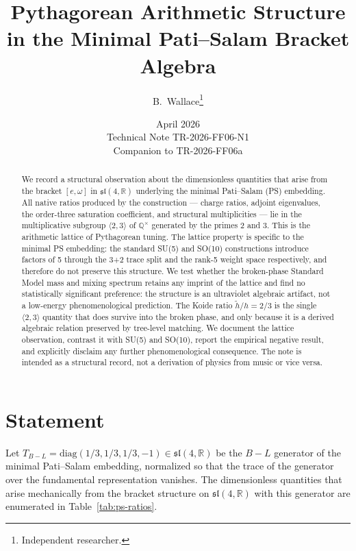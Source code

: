 \documentclass[11pt]{article}
\title{Pythagorean Arithmetic Structure in the Minimal Pati--Salam
Bracket Algebra}
\author{B.~Wallace\thanks{Independent researcher.}}
\date{April 2026 \\ Technical Note TR-2026-FF06-N1 \\
Companion to TR-2026-FF06a}
\theoremstyle{plain}
\theoremstyle{remark}
\newcommand{\sln}[1]{\mathfrak{sl}(#1,\mathbb{R})}
\newcommand{\TBL}{T_{B\!-\!L}}
\begin{document}
\maketitle

\begin{abstract}
We record a structural observation about the dimensionless quantities
that arise from the bracket $[e,\omega]$ in $\sln{4}$ underlying the
minimal Pati--Salam (PS) embedding.  All native ratios produced by
the construction --- charge ratios, adjoint eigenvalues, the
order-three saturation coefficient, and structural multiplicities
--- lie in the multiplicative subgroup $\langle 2, 3 \rangle$ of
$\mathbb{Q}^\times$ generated by the primes 2 and 3.  This is the
arithmetic lattice of Pythagorean tuning.  The lattice property is
specific to the minimal PS embedding: the standard SU(5) and SO(10)
constructions introduce factors of 5 through the 3+2 trace split and
the rank-5 weight space respectively, and therefore do not preserve
this structure.  We test whether the broken-phase Standard Model
mass and mixing spectrum retains any imprint of the lattice and
find no statistically significant preference: the structure is an
ultraviolet algebraic artifact, not a low-energy phenomenological
prediction.  The Koide ratio $\tilde h/h = 2/3$ is the single
$\langle 2, 3 \rangle$ quantity that does survive into the broken
phase, and only because it is a derived algebraic relation
preserved by tree-level matching.  We document the lattice
observation, contrast it with SU(5) and SO(10), report the
empirical negative result, and explicitly disclaim any further
phenomenological consequence.  The note is intended as a
structural record, not a derivation of physics from music or
vice versa.
\end{abstract}

\section{Statement}

Let $\TBL = \mathrm{diag}(1/3, 1/3, 1/3, -1) \in \sln{4}$ be the
$B-L$ generator of the minimal Pati--Salam embedding, normalized so
that the trace of the generator over the fundamental representation
vanishes.  The dimensionless quantities that arise mechanically from
the bracket structure on $\sln{4}$ with this generator are
enumerated in Table~\ref{tab:ps-ratios}.
\end{document}
